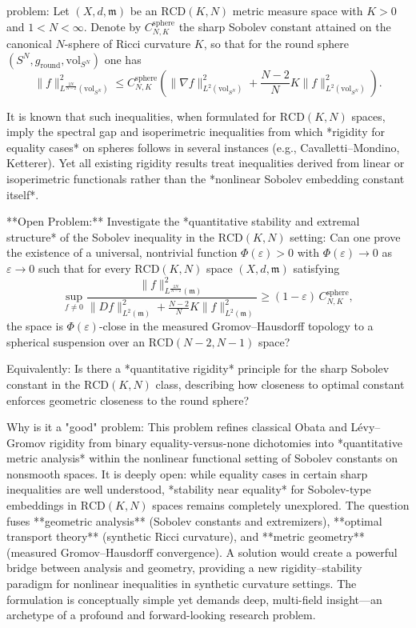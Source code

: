 problem:  
Let \((X, d, \mathfrak{m})\) be an \(\mathrm{RCD}(K,N)\) metric measure space with \(K>0\) and \(1<N<\infty\).  
Denote by \(C_{N,K}^{\mathrm{sphere}}\) the sharp Sobolev constant attained on the canonical \(N\)-sphere of Ricci curvature \(K\), so that for the round sphere \((S^N, g_{\mathrm{round}}, \mathrm{vol}_{S^N})\) one has  
\[
\|f\|_{L^{\frac{2N}{N-2}}(\mathrm{vol}_{S^N})}^2 
\le C_{N,K}^{\mathrm{sphere}}\left(
   \|\nabla f\|_{L^2(\mathrm{vol}_{S^N})}^2 + 
   \frac{N-2}{N} K \|f\|_{L^2(\mathrm{vol}_{S^N})}^2
\right).
\]  

It is known that such inequalities, when formulated for \(\mathrm{RCD}(K,N)\) spaces, imply the spectral gap and isoperimetric inequalities from which *rigidity for equality cases* on spheres follows in several instances (e.g., Cavalletti–Mondino, Ketterer). Yet all existing rigidity results treat inequalities derived from linear or isoperimetric functionals rather than the *nonlinear Sobolev embedding constant itself*.  

**Open Problem:**  
Investigate the *quantitative stability and extremal structure* of the Sobolev inequality in the \(\mathrm{RCD}(K,N)\) setting:  
Can one prove the existence of a universal, nontrivial function \(\Phi(\varepsilon)>0\) with \(\Phi(\varepsilon)\to 0\) as \(\varepsilon\to 0\) such that  
for every \(\mathrm{RCD}(K,N)\) space \((X,d,\mathfrak{m})\) satisfying  
\[
\sup_{f\ne 0}
\frac{\|f\|_{L^{\frac{2N}{N-2}}(\mathfrak{m})}^2}
     {\|Df\|_{L^2(\mathfrak{m})}^2 + \frac{N-2}{N}K\|f\|_{L^2(\mathfrak{m})}^2}
\ge (1-\varepsilon)\, C_{N,K}^{\mathrm{sphere}},
\]
the space is \(\Phi(\varepsilon)\)-close in the measured Gromov–Hausdorff topology to a spherical suspension over an \(\mathrm{RCD}(N-2,N-1)\) space?  

Equivalently:  
Is there a *quantitative rigidity* principle for the sharp Sobolev constant in the \(\mathrm{RCD}(K,N)\) class, describing how closeness to optimal constant enforces geometric closeness to the round sphere?  

Why is it a "good" problem:  
This problem refines classical Obata and Lévy–Gromov rigidity from binary equality-versus-none dichotomies into *quantitative metric analysis* within the nonlinear functional setting of Sobolev constants on nonsmooth spaces.  
It is deeply open: while equality cases in certain sharp inequalities are well understood, *stability near equality* for Sobolev-type embeddings in \(\mathrm{RCD}(K,N)\) spaces remains completely unexplored. The question fuses **geometric analysis** (Sobolev constants and extremizers), **optimal transport theory** (synthetic Ricci curvature), and **metric geometry** (measured Gromov–Hausdorff convergence).  
A solution would create a powerful bridge between analysis and geometry, providing a new rigidity–stability paradigm for nonlinear inequalities in synthetic curvature settings. The formulation is conceptually simple yet demands deep, multi-field insight—an archetype of a profound and forward-looking research problem.